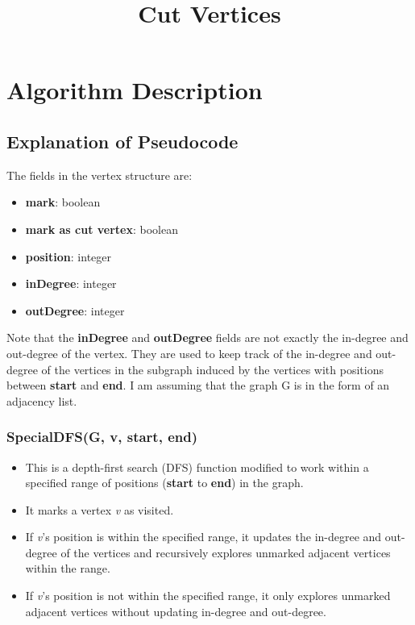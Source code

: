 \documentclass{article}
\title{Cut Vertices}
\begin{document}
\maketitle
\section{Algorithm Description}


\subsection{Explanation of Pseudocode}
The fields in the vertex structure are:
\begin{itemize}
    \item \textbf{mark}: boolean
    \item \textbf{mark as cut vertex}: boolean
    \item \textbf{position}: integer
    \item \textbf{inDegree}: integer
    \item \textbf{outDegree}: integer
\end{itemize}

Note that the \textbf{inDegree} and \textbf{outDegree} fields are not exactly the in-degree and out-degree of the vertex. They are used to keep track of the in-degree and out-degree of the vertices in the subgraph induced by the vertices with positions between \textbf{start} and \textbf{end}. I am assuming that the graph G is in the form of an adjacency list.

\subsubsection{SpecialDFS(G, v, start, end)}
\begin{itemize}
    \item This is a depth-first search (DFS) function modified to work within a specified range of positions (\textbf{start} to \textbf{end}) in the graph.
    \item It marks a vertex \textit{v} as visited.
    \item If \textit{v}'s position is within the specified range, it updates the in-degree and out-degree of the vertices and recursively explores unmarked adjacent vertices within the range.
    \item If \textit{v}'s position is not within the specified range, it only explores unmarked adjacent vertices without updating in-degree and out-degree.
\end{itemize}
\end{document}
